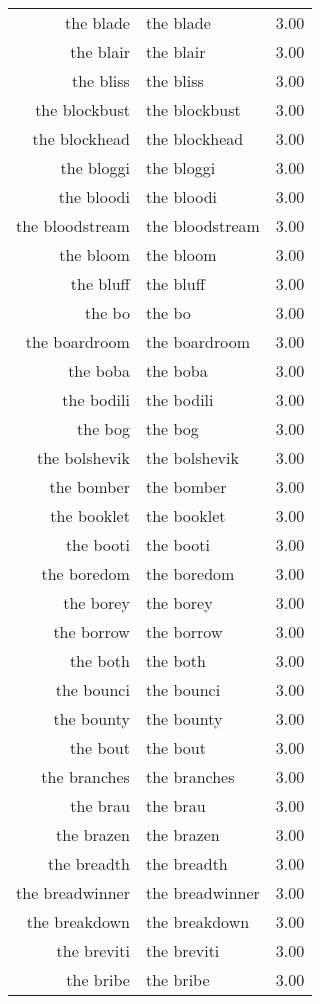 \begin{table}[ht]
\begin{tabular}{rlr}
  the blade & the blade & 3.00 \\ 
  the blair & the blair & 3.00 \\ 
  the bliss & the bliss & 3.00 \\ 
  the blockbust & the blockbust & 3.00 \\ 
  the blockhead & the blockhead & 3.00 \\ 
  the bloggi & the bloggi & 3.00 \\ 
  the bloodi & the bloodi & 3.00 \\ 
  the bloodstream & the bloodstream & 3.00 \\ 
  the bloom & the bloom & 3.00 \\ 
  the bluff & the bluff & 3.00 \\ 
  the bo & the bo & 3.00 \\ 
  the boardroom & the boardroom & 3.00 \\ 
  the boba & the boba & 3.00 \\ 
  the bodili & the bodili & 3.00 \\ 
  the bog & the bog & 3.00 \\ 
  the bolshevik & the bolshevik & 3.00 \\ 
  the bomber & the bomber & 3.00 \\ 
  the booklet & the booklet & 3.00 \\ 
  the booti & the booti & 3.00 \\ 
  the boredom & the boredom & 3.00 \\ 
  the borey & the borey & 3.00 \\ 
  the borrow & the borrow & 3.00 \\ 
  the both & the both & 3.00 \\ 
  the bounci & the bounci & 3.00 \\ 
  the bounty & the bounty & 3.00 \\ 
  the bout & the bout & 3.00 \\ 
  the branches & the branches & 3.00 \\ 
  the brau & the brau & 3.00 \\ 
  the brazen & the brazen & 3.00 \\ 
  the breadth & the breadth & 3.00 \\ 
  the breadwinner & the breadwinner & 3.00 \\ 
  the breakdown & the breakdown & 3.00 \\ 
  the breviti & the breviti & 3.00 \\ 
  the bribe & the bribe & 3.00 \\ 

\end{tabular}
\end{table}
